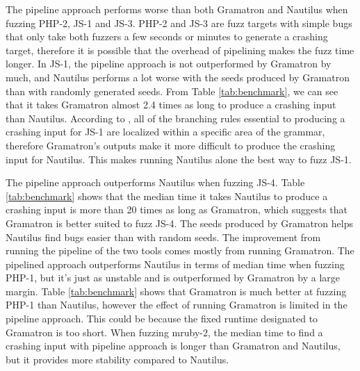 The pipeline approach performs worse than both Gramatron and Nautilus when fuzzing PHP-2, JS-1 and JS-3. PHP-2 and JS-3 are fuzz targets with simple bugs that only take both fuzzers a few seconds or minutes to generate a crashing target, therefore it is possible that the overhead of pipelining makes the fuzz time longer. In JS-1, the pipeline approach is not outperformed by Gramatron by much, and Nautilus performs a lot worse with the seeds produced by Gramatron than with randomly generated seeds. From Table \ref{tab:benchmark}, we can see that it takes Gramatron almost 2.4 times as long to produce a crashing input than Nautilus. %
According to \cite{srivastava_payer_2021}, all of the branching rules essential to producing a crashing input for JS-1 are localized within a specific area of the grammar, therefore Gramatron's outputs make it more difficult to produce the crashing input for Nautilus. This makes running Nautilus alone the best way to fuzz JS-1.

The pipeline approach outperforms Nautilus when fuzzing JS-4. Table \ref{tab:benchmark} shows that the median time it takes Nautilus to produce a crashing input is more than 20 times as long as Gramatron, which suggests that Gramatron is better suited to fuzz JS-4. The seeds produced by Gramatron helps Nautilus find bugs easier than with random seeds. The improvement from running the pipeline of the two tools comes mostly from running Gramatron. The pipelined approach outperforms Nautilus in terms of median time when fuzzing PHP-1, but it's just as unstable and is outperformed by Gramatron by a large margin. Table \ref{tab:benchmark} shows that Gramatron is much better at fuzzing PHP-1 than Nautilus, however the effect of running Gramatron is limited in the pipeline approach. This could be because the fixed runtime designated to Gramatron is too short. When fuzzing mruby-2, the median time to find a crashing input with pipeline approach is longer than Gramatron and Nautilus, but it provides more stability compared to Nautilus.

